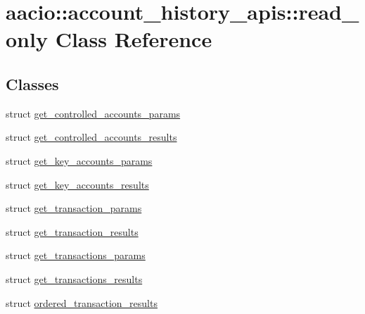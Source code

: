 \hypertarget{classaacio_1_1account__history__apis_1_1read__only}{}\section{aacio\+:\+:account\+\_\+history\+\_\+apis\+:\+:read\+\_\+only Class Reference}
\label{classaacio_1_1account__history__apis_1_1read__only}
\subsection*{Classes}
\begin{DoxyCompactItemize}
\item 
struct \mbox{\hyperlink{structaacio_1_1account__history__apis_1_1read__only_1_1get__controlled__accounts__params}{get\+\_\+controlled\+\_\+accounts\+\_\+params}}
\item 
struct \mbox{\hyperlink{structaacio_1_1account__history__apis_1_1read__only_1_1get__controlled__accounts__results}{get\+\_\+controlled\+\_\+accounts\+\_\+results}}
\item 
struct \mbox{\hyperlink{structaacio_1_1account__history__apis_1_1read__only_1_1get__key__accounts__params}{get\+\_\+key\+\_\+accounts\+\_\+params}}
\item 
struct \mbox{\hyperlink{structaacio_1_1account__history__apis_1_1read__only_1_1get__key__accounts__results}{get\+\_\+key\+\_\+accounts\+\_\+results}}
\item 
struct \mbox{\hyperlink{structaacio_1_1account__history__apis_1_1read__only_1_1get__transaction__params}{get\+\_\+transaction\+\_\+params}}
\item 
struct \mbox{\hyperlink{structaacio_1_1account__history__apis_1_1read__only_1_1get__transaction__results}{get\+\_\+transaction\+\_\+results}}
\item 
struct \mbox{\hyperlink{structaacio_1_1account__history__apis_1_1read__only_1_1get__transactions__params}{get\+\_\+transactions\+\_\+params}}
\item 
struct \mbox{\hyperlink{structaacio_1_1account__history__apis_1_1read__only_1_1get__transactions__results}{get\+\_\+transactions\+\_\+results}}
\item 
struct \mbox{\hyperlink{structaacio_1_1account__history__apis_1_1read__only_1_1ordered__transaction__results}{ordered\+\_\+transaction\+\_\+results}}
\end{DoxyCompactItemize}
